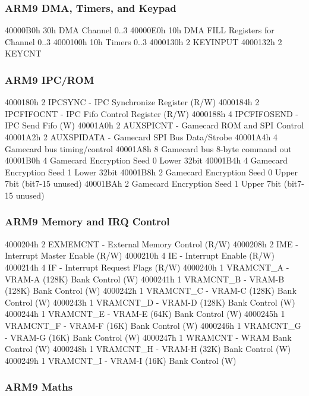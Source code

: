 \documentclass[11pt,a4paper]{proc}
\begin{document}
\begin{flushleft}
\subsubsection{ARM9 DMA, Timers, and Keypad}

  40000B0h  30h  DMA Channel 0..3
  40000E0h  10h  DMA FILL Registers for Channel 0..3
  4000100h  10h  Timers 0..3
  4000130h  2    KEYINPUT
  4000132h  2    KEYCNT

\subsubsection{ARM9 IPC/ROM}

  4000180h  2  IPCSYNC - IPC Synchronize Register (R/W)
  4000184h  2  IPCFIFOCNT - IPC Fifo Control Register (R/W)
  4000188h  4  IPCFIFOSEND - IPC Send Fifo (W)
  40001A0h  2  AUXSPICNT - Gamecard ROM and SPI Control
  40001A2h  2  AUXSPIDATA - Gamecard SPI Bus Data/Strobe
  40001A4h  4  Gamecard bus timing/control
  40001A8h  8  Gamecard bus 8-byte command out
  40001B0h  4  Gamecard Encryption Seed 0 Lower 32bit
  40001B4h  4  Gamecard Encryption Seed 1 Lower 32bit
  40001B8h  2  Gamecard Encryption Seed 0 Upper 7bit (bit7-15 unused)
  40001BAh  2  Gamecard Encryption Seed 1 Upper 7bit (bit7-15 unused)

\subsubsection{ARM9 Memory and IRQ Control}

  4000204h  2  EXMEMCNT - External Memory Control (R/W)
  4000208h  2  IME - Interrupt Master Enable (R/W)
  4000210h  4  IE  - Interrupt Enable (R/W)
  4000214h  4  IF  - Interrupt Request Flags (R/W)
  4000240h  1  VRAMCNT\_A - VRAM-A (128K) Bank Control (W)
  4000241h  1  VRAMCNT\_B - VRAM-B (128K) Bank Control (W)
  4000242h  1  VRAMCNT\_C - VRAM-C (128K) Bank Control (W)
  4000243h  1  VRAMCNT\_D - VRAM-D (128K) Bank Control (W)
  4000244h  1  VRAMCNT\_E - VRAM-E (64K) Bank Control (W)
  4000245h  1  VRAMCNT\_F - VRAM-F (16K) Bank Control (W)
  4000246h  1  VRAMCNT\_G - VRAM-G (16K) Bank Control (W)
  4000247h  1  WRAMCNT   - WRAM Bank Control (W)
  4000248h  1  VRAMCNT\_H - VRAM-H (32K) Bank Control (W)
  4000249h  1  VRAMCNT\_I - VRAM-I (16K) Bank Control (W)

\subsubsection{ARM9 Maths}


\end{flushleft}
\end{document}
